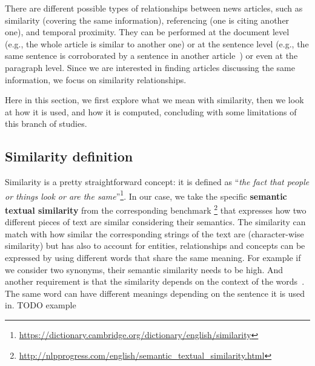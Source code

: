 There are different possible types of relationships between news articles, such as similarity (covering the same information), referencing (one is citing another one), and temporal proximity. They can be performed at the document level (e.g., the whole article is similar to another one) or at the sentence level (e.g., the same sentence is corroborated by a sentence in another article~\cite{bountouridis2018explaining}) or even at the paragraph level.
Since we are interested in finding articles discussing the same information, we focus on similarity relationships.

Here in this section, we first explore what we mean with similarity, then we look at how it is used, and how it is computed, concluding with some limitations of this branch of studies.

\subsection{Similarity definition}

Similarity is a pretty straightforward concept: it is defined as ``\emph{the fact that people or things look or are the same}''\footnote{\url{https://dictionary.cambridge.org/dictionary/english/similarity}}. In our case, we take the specific \textbf{semantic textual similarity} from the corresponding benchmark \footnote{\url{http://nlpprogress.com/english/semantic\_textual\_similarity.html}} that expresses how two different pieces of text are similar considering their semantics.
The similarity can match with how similar the corresponding strings of the text are (character-wise similarity) but has also to account for entities, relationships and concepts can be expressed by using different words that share the same meaning.
For example if we consider two synonyms, their semantic similarity needs to be high. 
And another requirement is that the similarity depends on the context of the words~\cite{miller1991contextual}. The same word can have different meanings depending on the sentence it is used in.
TODO example

